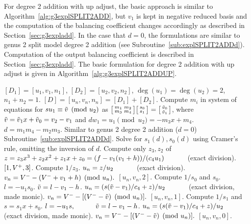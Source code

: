 For degree 2 addition with up adjust, the basic approach is similar to
Algorithm~\ref{alg:g3explSPLIT2ADD}, but $v_1$ is kept in negative reduced basis
and the computation of the balancing coefficient changes accordingly as
described in Section~\ref{sec:g3expladd}. In the case that $d=0$, the
formulations are similar to genus 2 split model degree 2 addition (see
Subroutine~\ref{sub:explSPLIT2ADDd}). Computation of the output balancing
coefficient is described in Section~\ref{sec:g3expladd}. The basic formulation
for degree 2 addition with up adjust is given in
Algorithm~\ref{alg:g3explSPLIT2ADDUP}.



\begin{algorithm}[H]
\caption{Genus 3 Split Model Degree 2 Addition with Up Adjust\label{alg:g3explSPLIT2ADDUP}}
\begin{algorithmic} [1]
\Require $[D_1] = [u_1,v_1,n_1]$, $[D_2] = [u_2,v_2,n_2]$, $\deg(u_1) = \deg(u_2) = 2$, $n_1 + n_2 = 1$.
\Ensure $[D] = [u_n,v_n,n_n] = [D_1] + [D_2] $.
\algrule
\vspace{-2pt}
\State Compute $m_i$ in system of equations for $su_1\equiv \tilde{v} \pmod{u_2}$ as $ \bigl[ \begin{smallmatrix} m_1 & m_2\\ m_3 & m_4\end{smallmatrix}\bigr] \bigl[ \begin{smallmatrix} s_0\\ s_1 \end{smallmatrix} \bigr ] = \bigl[ \begin{smallmatrix}\tilde{v}_0 \\  \tilde{v}_1\end{smallmatrix} \bigr ]$, where $\tilde{v} = \tilde{v}_1x + \tilde{v}_0 = v_2 - v_1$ and $dw_1 = u_1 \pmod{u_2} = -m_3x + m_4$.
\State $d = m_1m_4 - m_2m_3$.
    \State Similar to genus 2 degree 2 addition ($d=0$) Subroutine~\ref{sub:explSPLIT2ADDd}.
\EndIf
\State Solve for $s_1(d), s_0(d)$ using Cramer's rule, omitting the inversion of $d$.
\State Compute only $z_3, z_2$ of $z = z_3x^3 + z_2x^2 + z_1x + z_0 = (f - v_1(v_1 + h))/(c_4u_1) \quad\quad\quad$ (exact division).  
         \Return $[1,V^{+},3]$.
        \Else \hspace{3pt} Compute $1/z_3$.
            \State $u_n = z/u_2 \quad\quad\quad$ (exact division).
            \State $v_n = V^{-} - (V^{-} + v_1 + h) \pmod{u_n}.$
            \State \Return $[u_n,v_n,2]$.
        \EndIf
    \Else \hspace{3pt} Compute $1/s_0$ and $s_0$.
        \State $l = -u_1s_0$.
        \State $\tilde{v} = l - v_1 - h$.
        \State $u_n = (s(\tilde{v} - v_1)/c_4 + z)/u_2 \quad\quad\quad$ (exact division, made monic).
        \State $v_n = V^{-} - [(V^{-} - \tilde{v}) \pmod{u_n}].$
        \State \Return $[u_n,v_n,1]$.
    \EndIf
\EndIf
\State Compute $1/s_1$ and $s = s_1x + s_0$.
\State $l = -u_1s, \quad\quad\quad \tilde{v} = l - v_1 - h$.
\State $u_n = (s(\tilde{v} - v_1)/c_4 + z)/u_2 \quad\quad\quad$ (exact division, made monic).
\State $v_n = V^{-} - [(V^{-} - \tilde{v}) \pmod{u_n}].$ 
\State \Return $[u_n,v_n,0]$.
\vspace{-2pt}
\end{algorithmic}
\end{algorithm}

